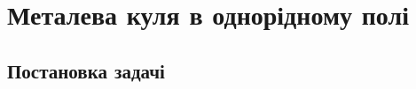 %
%
%
%
%
%
%
%
%
%
%
%

\section{Металева куля в однорідному полі}

\subsection*{Постановка задачі}

